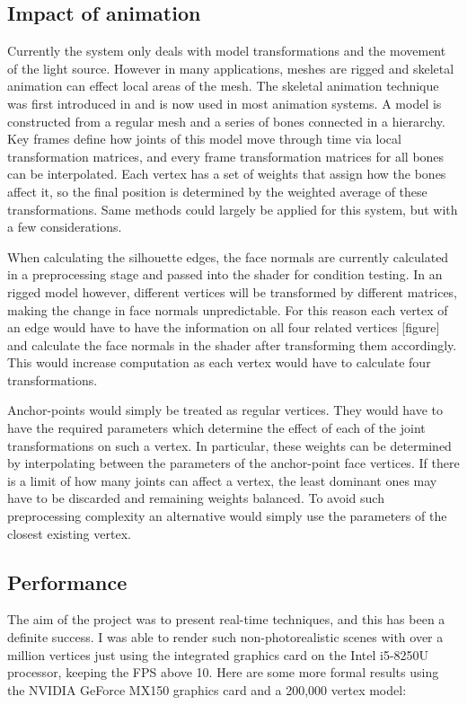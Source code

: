 \documentclass[a4paper, 12pt]{article}
\begin{document}
\subsection{Impact of animation}
Currently the system only deals with model transformations and the movement of the light source. However in many applications, meshes are rigged and skeletal animation can effect local areas of the mesh. The skeletal animation technique was first introduced in \cite{Thalmann1989} and is now used in most animation systems. A model is constructed from a regular mesh and a series of bones connected in a hierarchy. Key frames define how joints of this model move through time via local transformation matrices, and every frame transformation matrices for all bones can be interpolated. Each vertex has a set of weights that assign how the bones affect it, so the final position is determined by the weighted average of these transformations. Same methods could largely be applied for this system, but with a few considerations.

When calculating the silhouette edges, the face normals are currently calculated in a preprocessing stage and passed into the shader for condition testing. In an rigged model however, different vertices will be transformed by different matrices, making the change in face normals unpredictable. For this reason each vertex of an edge would have to have the information on all four related vertices [figure] and calculate the face normals in the shader after transforming them accordingly. This would increase computation as each vertex would have to calculate four transformations.

Anchor-points would simply be treated as regular vertices. They would have to have the required parameters which determine the effect of each of the joint transformations on such a vertex. In particular, these weights can be determined by interpolating between the parameters of the anchor-point face vertices. If there is a limit of how many joints can affect a vertex, the least dominant ones may have to be discarded and remaining weights balanced. To avoid such preprocessing complexity an alternative would simply use the parameters of the closest existing vertex.

\subsection{Performance}
The aim of the project was to present real-time techniques, and this has been a definite success. I was able to render such non-photorealistic scenes with over a million vertices just using the integrated graphics card on the Intel i5-8250U processor, keeping the FPS above 10. Here are some more formal results using the NVIDIA GeForce MX150 graphics card and a 200,000 vertex model:
\end{document}
